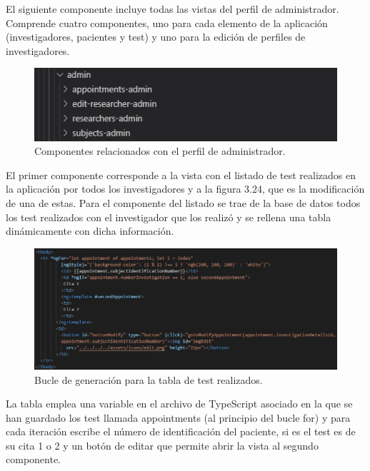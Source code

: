     El siguiente componente incluye todas las vistas del perfil de administrador. Comprende cuatro componentes, uno para cada elemento de la aplicación (investigadores, pacientes y test) y uno para la edición de perfiles de investigadores.
    
    \begin{figure}[h]
    \centering
    \includegraphics[width=1\textwidth]{images/adminComponents.jpg}
    \caption{Componentes relacionados con el perfil de administrador.}
    \end{figure}
    \FloatBarrier
    
    El primer componente corresponde a la vista con el listado de test realizados en la aplicación por todos los investigadores y a la figura 3.24, que es la modificación de una de estas. Para el componente del listado se trae de la base de datos todos los test realizados con el investigador que los realizó y se rellena una tabla dinámicamente con dicha información.
    
    \begin{figure}[h]
    \centering
    \includegraphics[width=1\textwidth]{images/appointmentTable.jpg}
    \caption{Bucle de generación para la tabla de test realizados.}
    \end{figure}
    \FloatBarrier
    
    La tabla emplea una variable en el archivo de TypeScript asociado en la que se han guardado los test llamada appointments (al principio del bucle for) y para cada iteración escribe el número de identificación del paciente, si es el test es de su cita 1 o 2 y un botón de editar que permite abrir la vista al segundo componente.\newline
    
